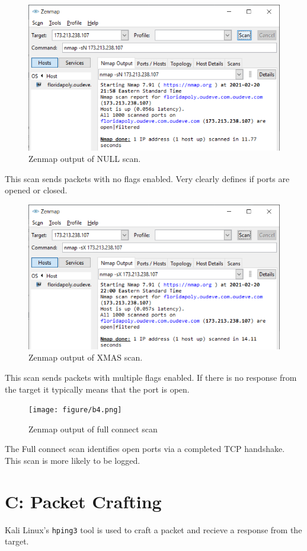 \begin{figure}[H]
    \centering
    \includegraphics[width=\linewidth]{figures/b2.png}
    \caption{Zenmap output of NULL scan.}
\end{figure}
This scan sends packets with no flags enabled.
Very clearly defines if ports are opened or closed.

\begin{figure}[H]
    \centering
    \includegraphics[width=\linewidth]{figures/b3.png}
    \caption{Zenmap output of XMAS scan.}
\end{figure}
This scan sends packets with multiple flags enabled.
If there is no response from the target it typically means that the port is open.

\begin{figure}[H]
    \centering
    \texttt{[image: figure/b4.png]}
    \caption{Zenmap output of full connect scan}
\end{figure}
The Full connect scan identifies open ports via a completed TCP handshake.
This scan is more likely to be logged.

\section*{C: Packet Crafting}
Kali Linux's \verb|hping3| tool is used to craft a packet and recieve a response from the target.
